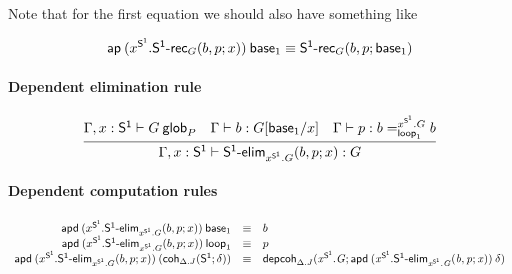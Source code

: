 Note that for the first equation we should also have something like
\begin{small}
  \[\mathsf{ap} \: {(x^{\mathsf{S^1}}.\mathsf{S^1\text{-}rec}_G(b, p; x))} \: {\mathsf{base}_{1}}
  \equiv \mathsf{S^1\text{-}rec}_G(b, p; \mathsf{base}_{1})\]
\end{small}

\paragraph{Dependent elimination rule}

\begin{small}
  \[
  \infer{\ofglob{\Gamma,x:\dsd{S^1}}{\dsd{S^1\text{-}elim}_{x^{\dsd{S^1}}.G}(b,
      p; x)}{G}} {\wfglob{\Gamma,x:\dsd{S^1}}{G}{m}{P} &
    \ofglob{\Gamma}{b}{G[\base{1}/x]} &
    \ofglob{\Gamma}{p}{\dhomj{x^{\dsd{S^1}}.G}{b}{b}{\lp{1}}}}
  \]
\end{small}

\paragraph{Dependent computation rules}

\begin{small}
  \[
  \begin{array}{rcl}
    \mathsf{apd} \: {(x^{\mathsf{S^1}}.\mathsf{S^1\text{-}elim}_{x^{\mathsf{S^1}}.G}(b, p; x))} \: {\mathsf{base}_{1}} & \equiv & b \\
    \mathsf{apd} \: {(x^{\mathsf{S^1}}.\mathsf{S^1\text{-}elim}_{x^{\mathsf{S^1}}.G}(b, p; x))} \: {\mathsf{loop}_{1}} & \equiv & p\\
    \mathsf{apd} \: {(x^{\mathsf{S^1}}.\mathsf{S^1\text{-}elim}_{x^{\mathsf{S^1}}.G}(b, p; x))} \: {(\mathsf{coh}_{\Delta.J} \mathit{(\mathsf{S^1};\delta)})} & \equiv &
    \mathsf{depcoh}_{\Delta.J} \mathit{(x^{\mathsf{S^1}}.G;\mathsf{apd} \: {(x^{\mathsf{S^1}}.\mathsf{S^1\text{-}elim}_{x^{\mathsf{S^1}}.G}(b, p; x))} \: {\delta})}
    \\
  \end{array}
  \]
\end{small}


